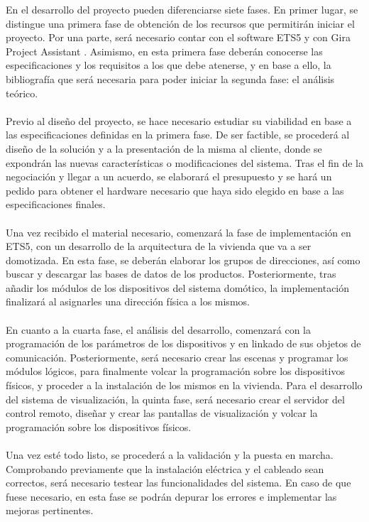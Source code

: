 En el desarrollo del proyecto pueden diferenciarse siete fases. En primer lugar, se distingue una primera fase de obtención de los recursos que permitirán iniciar el proyecto. Por una parte, será necesario contar con el software ETS5 y con Gira Project Assistant \cite{GiraApp:2021}. Asimismo, en esta primera fase deberán conocerse las especificaciones y los requisitos a los que debe atenerse, y en base a ello, la bibliografía que será necesaria para poder iniciar la segunda fase: el análisis teórico.\\\\
Previo al diseño del proyecto, se hace necesario estudiar su viabilidad en base a las especificaciones definidas en la primera fase. De ser factible, se procederá al diseño de la solución y a la presentación de la misma al cliente, donde se expondrán las nuevas características o modificaciones del sistema. Tras el fin de la negociación y llegar a un acuerdo, se elaborará el presupuesto y se hará un pedido para obtener el hardware necesario que haya sido elegido en base a las especificaciones finales.\\\\
Una vez recibido el material necesario, comenzará la fase de implementación en ETS5, con un desarrollo de la arquitectura de la vivienda que va a ser domotizada. En esta fase, se deberán elaborar los grupos de direcciones, así como buscar y descargar las bases de datos de los productos. Posteriormente, tras añadir los módulos de los dispositivos del sistema domótico, la implementación finalizará al  asignarles una dirección física a los mismos.\\\\
En cuanto a la cuarta fase, el análisis del desarrollo, comenzará con la programación de los parámetros de los dispositivos y en linkado de sus objetos de comunicación. Posteriormente, será necesario crear las escenas y programar los módulos lógicos, para finalmente volcar la programación sobre los dispositivos físicos, y proceder a la instalación de los mismos en la vivienda.
Para el desarrollo del sistema de visualización, la quinta fase, será necesario crear el servidor del control remoto, diseñar y crear las pantallas de visualización y volcar la programación sobre los dispositivos físicos.\\\\
Una vez esté todo listo, se procederá a la validación y la puesta en marcha. Comprobando previamente que la instalación eléctrica y el cableado sean correctos, será necesario testear las funcionalidades del sistema. En caso de que fuese necesario, en esta fase se podrán depurar los errores e implementar las mejoras pertinentes.


